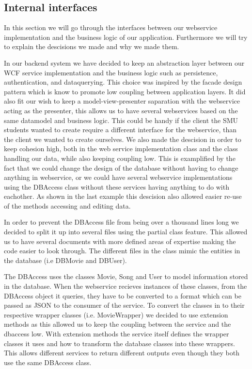 \subsection{Internal interfaces}
In this section we will go through the interfaces between our webservice implementation and the business logic of our application. Furthermore we will try to explain the descisions we made and why we made them.

In our backend system we have decided to keep an abstraction layer between our WCF service implementation and the business logic such as persistence, authentication, and dataquerying. This choice was inspired by the facade design pattern which is know to promote low coupling between application layers. It did also fit our wish to keep a model-view-presenter saparation with the webservice acting as the presenter, this allows us to have several webservices based on the same datamodel and business logic. This could be handy if the client the SMU students wanted to create require a different interface for the webservice, than the client we wanted to create ourselves. We also made the descision in order to keep cohesion high, both in the web service implementation class and the class handling our data, while also keeping coupling low. This is examplified by the fact that we could change the design of the database without having to change anything in webservice, or we could have several webservice implementations using the DBAccess class without these services having anything to do with eachother. As shown in the last example this descision also allowed easier re-use of the methods accessing and editing data.

In order to prevent the DBAccess file from being over a thousand lines long we decided to split it up into several files using the partial class feature. This allowed us to have several documents with more defined areas of expertise making the code easier to look through.  The different files in the class mimic the entities in the database (i.e DBMovie and DBUser).

The DBAccess uses the classes Movie, Song and User to model information stored in the database. When the webservice recieves instances of these classes, from the DBAccess object it queries, they have to be converted to a format which can be passed as JSON to the consumer of the service. To convert the classes in to their respective wrapper classes (i.e. MovieWrapper) we decided to use extension methods as this allowed us to keep the coupling between the service and the dbaccess low. With extension methods the service itself defines the wrapper classes it uses and how to transform the database classes into these wrappers. This allows different services to return different outputs even though they both use the same DBAccess class.